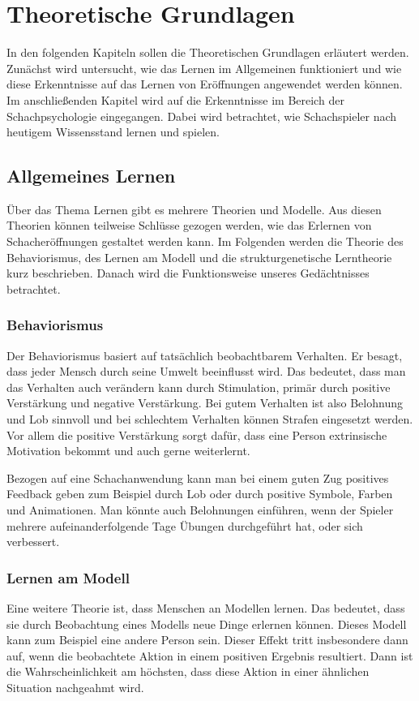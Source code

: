 
\chapter{Theoretische Grundlagen}
In den folgenden Kapiteln sollen die Theoretischen Grundlagen erläutert werden. Zunächst wird untersucht, wie das Lernen im Allgemeinen funktioniert und wie diese Erkenntnisse auf das Lernen von Eröffnungen angewendet werden können.
Im anschließenden Kapitel wird auf die Erkenntnisse im Bereich der Schachpsychologie eingegangen. Dabei wird betrachtet, wie Schachspieler nach heutigem Wissensstand lernen und spielen.

\section{Allgemeines Lernen}
Über das Thema Lernen gibt es mehrere Theorien und Modelle. Aus diesen Theorien können teilweise Schlüsse gezogen werden, wie das Erlernen von Schacheröffnungen gestaltet werden kann.
Im Folgenden werden die Theorie des Behaviorismus, des Lernen am Modell und die strukturgenetische Lerntheorie kurz beschrieben.
Danach wird die Funktionsweise unseres Gedächtnisses betrachtet.

\subsection{Behaviorismus}
Der Behaviorismus basiert auf tatsächlich beobachtbarem Verhalten. Er besagt, dass jeder Mensch durch seine Umwelt beeinflusst wird. Das bedeutet, dass man das Verhalten auch verändern kann durch Stimulation, primär durch positive Verstärkung und negative Verstärkung. Bei gutem Verhalten ist also Belohnung und Lob sinnvoll und bei schlechtem Verhalten können Strafen eingesetzt werden. Vor allem die positive Verstärkung sorgt dafür, dass eine Person extrinsische Motivation bekommt und auch gerne weiterlernt.
\cite{kron_grundwissen_2024}

Bezogen auf eine Schachanwendung kann man bei einem guten Zug positives Feedback geben zum Beispiel durch Lob oder durch positive Symbole, Farben und Animationen. Man könnte auch Belohnungen einführen, wenn der Spieler mehrere aufeinanderfolgende Tage Übungen durchgeführt hat, oder sich verbessert.

\subsection{Lernen am Modell}
Eine weitere Theorie ist, dass Menschen an Modellen lernen. Das bedeutet, dass sie durch Beobachtung eines Modells neue Dinge erlernen können. Dieses Modell kann zum Beispiel eine andere Person sein.
Dieser Effekt tritt insbesondere dann auf, wenn die beobachtete Aktion in einem positiven Ergebnis resultiert. Dann ist die Wahrscheinlichkeit am höchsten, dass diese Aktion in einer ähnlichen Situation nachgeahmt wird.
\cite{kron_grundwissen_2024}

